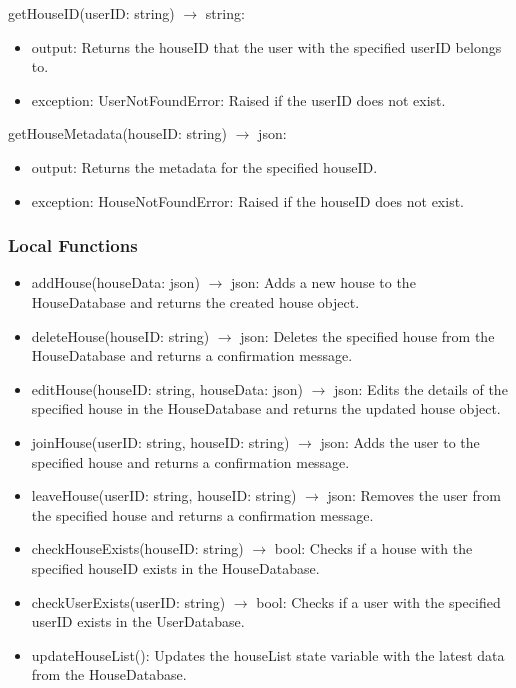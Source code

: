 \documentclass[12pt, titlepage]{article}
\begin{document}
\noindent getHouseID(userID: string) $\rightarrow$ string:
\begin{itemize}
\item output: Returns the houseID that the user with the specified userID belongs to.
\item exception: UserNotFoundError: Raised if the userID does not exist.
\end{itemize}

\noindent getHouseMetadata(houseID: string) $\rightarrow$ json:
\begin{itemize}
\item output: Returns the metadata for the specified houseID.
\item exception: HouseNotFoundError: Raised if the houseID does not exist.
\end{itemize}

\subsubsection{Local Functions}

\begin{itemize}
  \item addHouse(houseData: json) $\rightarrow$ json: Adds a new house to the HouseDatabase and returns the created house object.
  \item deleteHouse(houseID: string) $\rightarrow$ json: Deletes the specified house from the HouseDatabase and returns a confirmation message.
  \item editHouse(houseID: string, houseData: json) $\rightarrow$ json: Edits the details of the specified house in the HouseDatabase and returns the updated house object.
  \item joinHouse(userID: string, houseID: string) $\rightarrow$ json: Adds the user to the specified house and returns a confirmation message.
  \item leaveHouse(userID: string, houseID: string) $\rightarrow$ json: Removes the user from the specified house and returns a confirmation message.
  \item checkHouseExists(houseID: string) $\rightarrow$ bool: Checks if a house with the specified houseID exists in the HouseDatabase.
  \item checkUserExists(userID: string) $\rightarrow$ bool: Checks if a user with the specified userID exists in the UserDatabase.
  \item updateHouseList(): Updates the houseList state variable with the latest data from the HouseDatabase.
\end{itemize}
\end{document}
